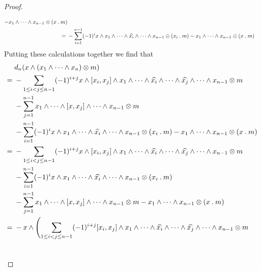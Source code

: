 \begin{proof}
\begin{enumerate}
\begin{align*}
        -
        x_1 \wedge \dotsb \wedge x_{n-1} \otimes (x \mathbin{.} m)
        \\
        ={}&
        -
        \sum_{i=1}^{n-1}
        (-1)^i
        x \wedge x_1 \wedge \dotsb \wedge \widehat{x_i} \wedge \dotsb \wedge x_{n-1} \otimes (x_i \mathbin{.} m)
        -
        x_1 \wedge \dotsb \wedge x_{n-1} \otimes (x \mathbin{.} m)
      \end{align*}
      Putting these calculations together we find that
      \begin{align*}
        {}&
        d_n( x \wedge (x_1 \wedge \dotsb \wedge x_n) \otimes m )
        \\
        ={}&
        -
        \sum_{1 \leq i < j \leq n-1}
        (-1)^{i + j}
        x \wedge [x_i, x_j] \wedge x_1 \wedge \dotsb \wedge \widehat{x_i} \wedge \dotsb \wedge \widehat{x_j} \wedge \dotsb \wedge x_{n-1}
        \otimes m
        \\
        {}&
        -
        \sum_{j=1}^{n-1}
        x_1 \wedge \dotsb \wedge [x, x_j] \wedge \dotsb \wedge x_{n-1}
        \otimes m
        \\
        {}&
        -
        \sum_{i=1}^{n-1}
        (-1)^i
        x \wedge x_1 \wedge \dotsb \wedge \widehat{x_i} \wedge \dotsb \wedge x_{n-1} \otimes (x_i \act m)
        -
        x_1 \wedge \dotsb \wedge x_{n-1} \otimes (x \act m)
        \\
        ={}&
        -
        \sum_{1 \leq i < j \leq n-1}
        (-1)^{i + j}
        x \wedge [x_i, x_j] \wedge x_1 \wedge \dotsb \wedge \widehat{x_i} \wedge \dotsb \wedge \widehat{x_j} \wedge \dotsb \wedge x_{n-1}
        \otimes m
        \\
        {}&
        -
        \sum_{i=1}^{n-1}
        (-1)^i
        x \wedge x_1 \wedge \dotsb \wedge \widehat{x_i} \wedge \dotsb \wedge x_{n-1} \otimes (x_i \act m)
        \\
        {}&
        -
        \sum_{j=1}^{n-1}
        x_1 \wedge \dotsb \wedge [x, x_j] \wedge \dotsb \wedge x_{n-1}
        \otimes m
        -
        x_1 \wedge \dotsb \wedge x_{n-1} \otimes (x \act m)
        \\
        ={}&
        -
        x \wedge
        \Biggl(
        \sum_{1 \leq i < j \leq n-1}
        (-1)^{i + j}
        [x_i, x_j] \wedge x_1 \wedge \dotsb \wedge \widehat{x_i} \wedge \dotsb \wedge \widehat{x_j} \wedge \dotsb \wedge x_{n-1}
        \otimes m
        \\
        {}&

\end{align*}
\end{enumerate}
\end{proof}
